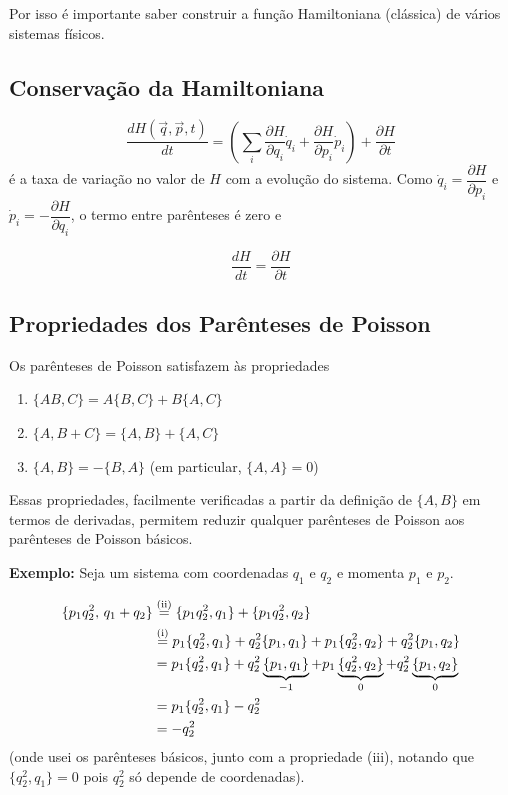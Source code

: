 Por isso é importante saber construir a função Hamiltoniana (clássica) de vários sistemas físicos.

\subsection*{Conservação da Hamiltoniana}

\begin{equation}
    \frac{dH(\vec{q}, \vec{p}, t)}{dt} = \left( \sum_i \frac{\partial H}{\partial q_i}\dot{q}_i + \frac{\partial H}{\partial p_i}\dot{p}_i \right) + \frac{\partial H}{\partial t}
\label{eq:aula9_dHdt}
\end{equation}
é a taxa de variação no valor de $H$ com a evolução do sistema. Como $\dot{q}_i = \dfrac{\partial H}{\partial p_i}$ e $\dot{p}_i = -\dfrac{\partial H}{\partial q_i}$, o termo entre parênteses é zero e

\begin{equation}
    \boxed{\frac{dH}{dt} = \frac{\partial H}{\partial t}}
\label{eq:aula9_dHdt_final}
\end{equation}


\subsection*{Propriedades dos Parênteses de Poisson}

Os parênteses de Poisson satisfazem às propriedades

\begin{enumerate}
    \item[(i)] $\{AB, C\} = A\{B, C\} + B\{A, C\}$
    \item[(ii)] $\{A, B+C\} = \{A, B\} + \{A, C\}$
    \item[(iii)] $\{A, B\} = -\{B, A\}$ \quad (em particular, $\{A, A\} = 0$)
\end{enumerate}

Essas propriedades, facilmente verificadas a partir da definição de $\{A, B\}$ em termos de derivadas, permitem reduzir qualquer parênteses de Poisson aos parênteses de Poisson básicos.

\textbf{Exemplo:} Seja um sistema com coordenadas $q_1$ e $q_2$ e momenta $p_1$ e $p_2$.

\begin{align}
    \{p_1 q_2^2, \, q_1 + q_2\} &\overset{\text{(ii)}}{=} \{p_1 q_2^2, q_1\} + \{p_1 q_2^2, q_2\} \notag \\
    &\overset{\text{(i)}}{=} p_1\{q_2^2, q_1\} + q_2^2\{p_1, q_1\} + p_1\{q_2^2, q_2\} + q_2^2\{p_1, q_2\} \notag \\
    &= p_1\{q_2^2, q_1\} + q_2^2\underbrace{\{p_1, q_1\}}_{-1} + p_1\underbrace{\{q_2^2, q_2\}}_{0} + q_2^2\underbrace{\{p_1, q_2\}}_{0} \notag \\
    &= p_1\{q_2^2, q_1\} - q_2^2 \notag \\
    &= -q_2^2
\label{eq:aula9_exemplo_poisson}
\end{align}
(onde usei os parênteses básicos, junto com a propriedade (iii), notando que $\{q_2^2, q_1\} = 0$ pois $q_2^2$ só depende de coordenadas).
